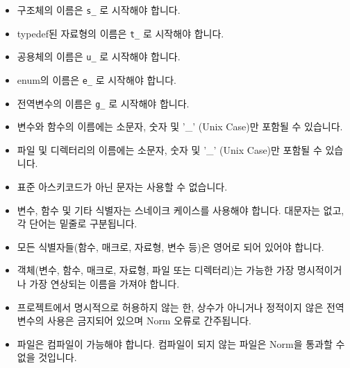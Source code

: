 \documentclass{42-ko}
\begin{document}
        \begin{itemize}

            \item 구조체의 이름은
                \texttt{s\_} 로 시작해야 합니다.

            \item typedef된 자료형의 이름은
                \texttt{t\_} 로 시작해야 합니다.

            \item 공용체의 이름은 \texttt{u\_} 로 시작해야 합니다.

            \item enum의 이름은 \texttt{e\_} 로 시작해야 합니다.

            \item 전역변수의 이름은 \texttt{g\_} 로 시작해야 합니다.

            \item 변수와 함수의 이름에는 소문자, 숫자 및 '\_' (Unix Case)만
                포함될 수 있습니다.

            \item 파일 및 디렉터리의 이름에는 소문자, 숫자 및 '\_' (Unix Case)만 
                포함될 수 있습니다.

            \item 표준 아스키코드가 아닌 문자는 사용할 수 없습니다.

            \item 변수, 함수 및 기타 식별자는 스네이크 케이스를 사용해야 합니다.
                대문자는 없고, 각 단어는 밑줄로 구분됩니다.

            \item 모든 식별자들(함수, 매크로, 자료형, 변수 등)은 
                영어로 되어 있어야 합니다.

            \item 객체(변수, 함수, 매크로, 자료형, 파일 또는 디렉터리)는 
                가능한 가장 명시적이거나 가장 연상되는 이름을 가져야 합니다.

            \item 프로젝트에서 명시적으로 허용하지 않는 한, 상수가 아니거나 
                정적이지 않은 전역변수의 사용은 금지되어 있으며 Norm 오류로 간주됩니다.

            \item 파일은 컴파일이 가능해야 합니다. 컴파일이 되지 않는 파일은
                Norm을 통과할 수 없을 것입니다.
        \end{itemize}
\newpage

\end{document}
